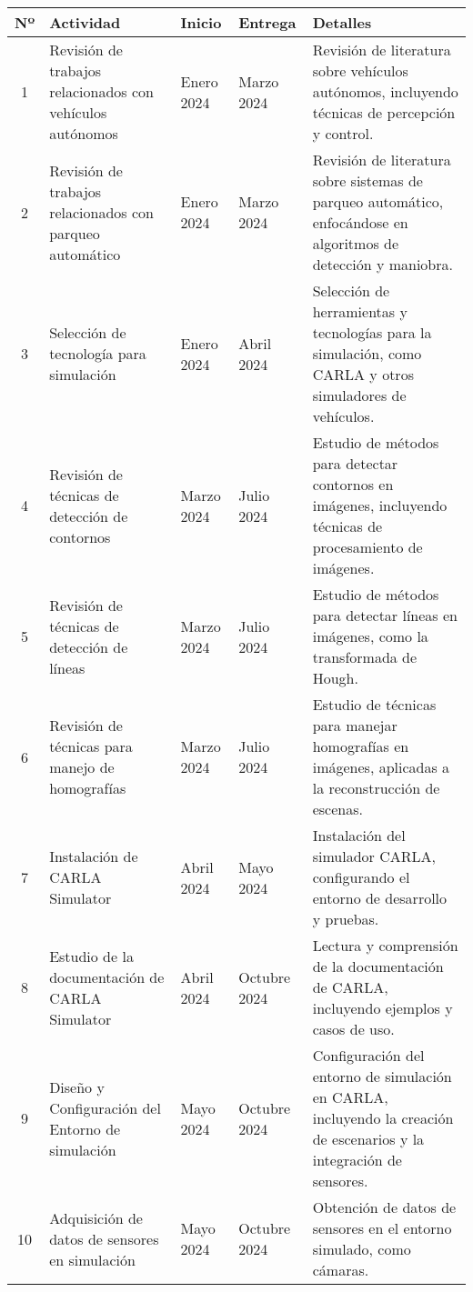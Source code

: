 \begin{center}
    \begin{tabularx}{\textwidth}{|c|p{4cm}|p{1cm}|p{1cm}|X|}
        \hline
        \textbf{Nº} & \textbf{Actividad} & \textbf{Inicio} & \textbf{Entrega} & \textbf{Detalles} \\
        \hline
        1 & Revisión de trabajos relacionados con vehículos autónomos & Enero 2024 & Marzo 2024 & Revisión de literatura sobre vehículos autónomos, incluyendo técnicas de percepción y control. \\
        \hline
        2 & Revisión de trabajos relacionados con parqueo automático & Enero 2024 & Marzo 2024 & Revisión de literatura sobre sistemas de parqueo automático, enfocándose en algoritmos de detección y maniobra. \\
        \hline
        3 & Selección de tecnología para simulación & Enero 2024 & Abril 2024 & Selección de herramientas y tecnologías para la simulación, como CARLA y otros simuladores de vehículos. \\
        \hline
        4 & Revisión de técnicas de detección de contornos & Marzo 2024 & Julio 2024 & Estudio de métodos para detectar contornos en imágenes, incluyendo técnicas de procesamiento de imágenes. \\
        \hline
        5 & Revisión de técnicas de detección de líneas & Marzo 2024 & Julio 2024 & Estudio de métodos para detectar líneas en imágenes, como la transformada de Hough. \\
        \hline
        6 & Revisión de técnicas para manejo de homografías & Marzo 2024 & Julio 2024 & Estudio de técnicas para manejar homografías en imágenes, aplicadas a la reconstrucción de escenas. \\
        \hline
        7 & Instalación de CARLA Simulator & Abril 2024 & Mayo 2024 & Instalación del simulador CARLA, configurando el entorno de desarrollo y pruebas. \\
        \hline
        8 & Estudio de la documentación de CARLA Simulator & Abril 2024 & Octubre 2024 & Lectura y comprensión de la documentación de CARLA, incluyendo ejemplos y casos de uso. \\
        \hline
        9 & Diseño y Configuración del Entorno de simulación & Mayo 2024 & Octubre 2024 & Configuración del entorno de simulación en CARLA, incluyendo la creación de escenarios y la integración de sensores. \\
        \hline
        10 & Adquisición de datos de sensores en simulación & Mayo 2024 & Octubre 2024 & Obtención de datos de sensores en el entorno simulado, como cámaras. \\

\end{tabularx}
\end{center}

